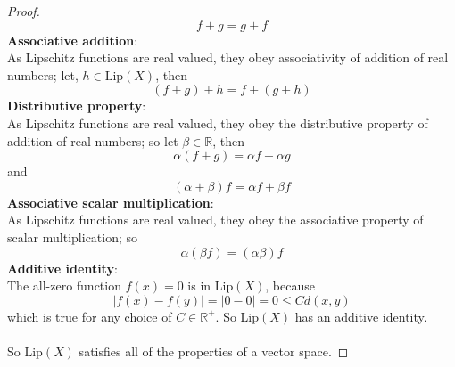 \documentclass{article}
\newcommand{\abs}[1]{\left|#1\right|}
\newcommand{\parens}[1]{\left(#1\right)}
\newcommand{\R}{\mathbb{R}}
\newcommand{\lip}[1]{\text{Lip}\parens{#1}}
\begin{document}
\begin{proof}
        $$f + g = g + f$$
        \textbf{Associative addition}:\\
        As Lipschitz functions are real valued, they obey 
        associativity of addition of real numbers; let, $h \in 
        \lip{X}$, then
        $$(f + g) + h = f + (g+h)$$
        \textbf{Distributive property}:\\
        As Lipschitz functions are real valued, they obey 
        the distributive property of addition of real numbers; so
        let $\beta \in \R$, then
        $$\alpha(f+g) = \alpha f + \alpha g$$
        and 
        $$(\alpha + \beta)f = \alpha f + \beta f$$ 
        \textbf{Associative scalar multiplication}:\\
        As Lipschitz functions are real valued, they obey 
        the associative property of scalar multiplication; so
        $$\alpha(\beta f) = (\alpha\beta)f$$
        \textbf{Additive identity}:\\
        The all-zero function $f(x) = 0$ is in $\lip{X}$, because
        $$\abs{f(x)-f(y)} = \abs{0-0} = 0 \leq Cd(x,y)$$
        which is true for any choice of $C \in \R^+$. So 
        $\lip{X}$ has an additive identity.\\\\
        So $\lip{X}$ satisfies all of the properties of a 
        vector space.
        
        \end{proof}
        
\end{document}

